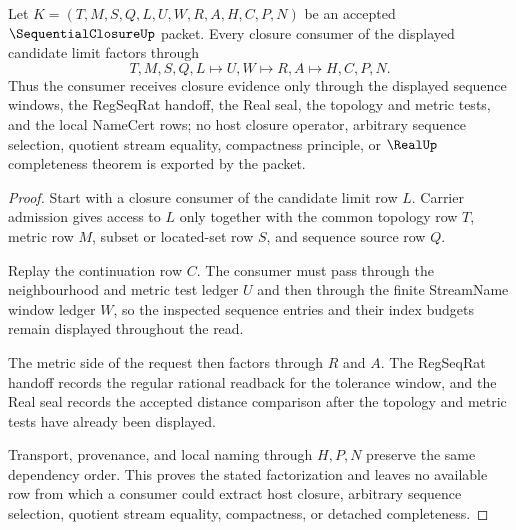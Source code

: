 \begin{theorem}
\label{thm:sequential-closure-sequence-limit-handoff}
Let $K=(T,M,S,Q,L,U,W,R,A,H,C,P,N)$ be an accepted $\SequentialClosureUp$ packet. Every closure consumer of the displayed candidate limit factors through
$$
T,M,S,Q,L \longmapsto U,W \longmapsto R,A \longmapsto H,C,P,N .
$$
Thus the consumer receives closure evidence only through the displayed sequence windows, the RegSeqRat handoff, the Real seal, the topology and metric tests, and the local NameCert rows; no host closure operator, arbitrary sequence selection, quotient stream equality, compactness principle, or $\RealUp$ completeness theorem is exported by the packet.
\end{theorem}
\begin{proof}
Start with a closure consumer of the candidate limit row $L$. Carrier admission gives access to $L$ only together with the common topology row $T$, metric row $M$, subset or located-set row $S$, and sequence source row $Q$.

Replay the continuation row $C$. The consumer must pass through the neighbourhood and metric test ledger $U$ and then through the finite StreamName window ledger $W$, so the inspected sequence entries and their index budgets remain displayed throughout the read.

The metric side of the request then factors through $R$ and $A$. The RegSeqRat handoff records the regular rational readback for the tolerance window, and the Real seal records the accepted distance comparison after the topology and metric tests have already been displayed.

Transport, provenance, and local naming through $H,P,N$ preserve the same dependency order. This proves the stated factorization and leaves no available row from which a consumer could extract host closure, arbitrary sequence selection, quotient stream equality, compactness, or detached completeness.
\end{proof}

